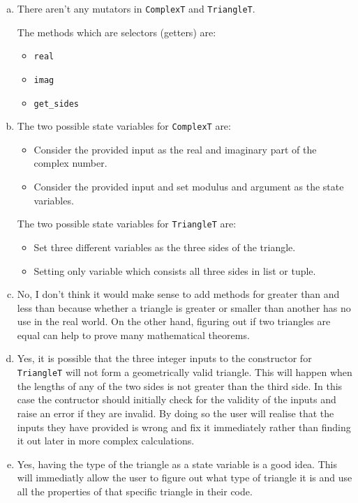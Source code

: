 \documentclass[12pt]{article}
\begin{document}
\begin{enumerate}[(a)]
	\item There aren't any mutators in \verb|ComplexT| and \verb|TriangleT|.

	The methods which are selectors (getters) are:
		\begin{itemize}
			\item \verb|real|
			\item \verb|imag|
			\item \verb|get_sides|
		\end{itemize}

	\item The two possible state variables for \verb|ComplexT| are:
		\begin{itemize}
			\item Consider the provided input as the real and imaginary part of the complex 
			number.
			\item Consider the provided input and set modulus and argument as the state variables.
		\end{itemize}

		The two possible state variables for \verb|TriangleT| are:
		\begin{itemize}
			\item Set three different variables as the three sides of the triangle.
			\item Setting only variable which consists all three sides in list or tuple.
		\end{itemize}

	\item No, I don't think it would make sense to add methods for greater than and less than because whether a triangle is greater or smaller than another has no use in the real world. On the other hand, figuring out if two triangles are equal can help to prove many mathematical theorems.

	\item Yes, it is possible that the three integer inputs to the constructor for \verb|TriangleT| will not form a geometrically valid triangle. This will happen when the lengths of any of the two sides is not greater than the third side. In this case the contructor should initially check for the validity of the inputs and raise an error if they are invalid. By doing so the user will realise that the inputs they have provided is wrong and fix it immediately rather than finding it out later in more complex calculations.

	\item Yes, having the type of the triangle as a state variable is a good idea. This will immediatly allow the user to figure out what type of triangle it is and use all the properties of that specific triangle in their code. 


\end{enumerate}
\end{document}
